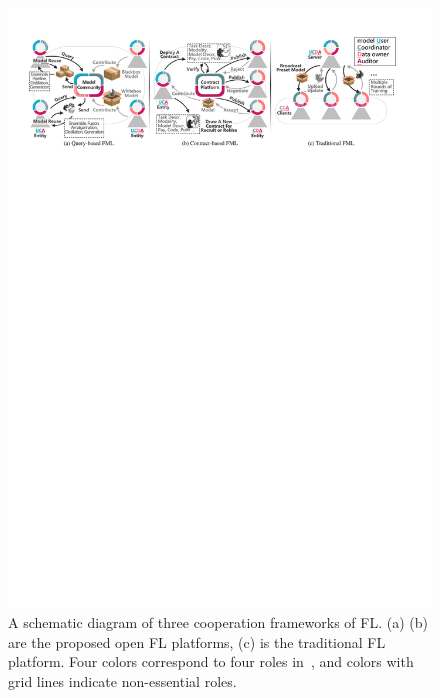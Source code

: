 \begin{figure}[b]
    \centering
    \includegraphics[width=\linewidth]{fig/coop_frame.pdf}
    \caption{A schematic diagram of three cooperation frameworks of FL. (a) (b) are the proposed open FL platforms, (c) is the traditional FL platform. Four colors correspond to four roles in~\cite{IEEEstd3652}, and colors with grid lines indicate non-essential roles.}
    \Description{}
    \label{fig:coop}
  \end{figure}


